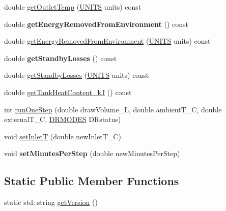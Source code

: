 \begin{DoxyCompactItemize}
\item 
double \hyperlink{class_h_p_w_h_a0b75a215e395f52d60997f9b07d37de7}{get\-Outlet\-Temp} (\hyperlink{class_h_p_w_h_a145320dbf116b9245ac4421026cff294}{U\-N\-I\-T\-S} units) const 
\item 
\hypertarget{class_h_p_w_h_a4ee36fec9eb6e1294ad200aeca2da87f}{double {\bfseries get\-Energy\-Removed\-From\-Environment} () const }\label{class_h_p_w_h_a4ee36fec9eb6e1294ad200aeca2da87f}

\item 
double \hyperlink{class_h_p_w_h_af58e48e9103fbb5525a251744816cc77}{get\-Energy\-Removed\-From\-Environment} (\hyperlink{class_h_p_w_h_a145320dbf116b9245ac4421026cff294}{U\-N\-I\-T\-S} units) const 
\item 
\hypertarget{class_h_p_w_h_ae615d088a390d0e1db95a196406ba2b4}{double {\bfseries get\-Standby\-Losses} () const }\label{class_h_p_w_h_ae615d088a390d0e1db95a196406ba2b4}

\item 
double \hyperlink{class_h_p_w_h_a5cccd4667bf976b0a6c1d33ce5fec880}{get\-Standby\-Losses} (\hyperlink{class_h_p_w_h_a145320dbf116b9245ac4421026cff294}{U\-N\-I\-T\-S} units) const 
\item 
double \hyperlink{class_h_p_w_h_a38039325e4eb5b4537ccafd0a4e3c1ad}{get\-Tank\-Heat\-Content\-\_\-k\-J} () const 
\item 
int \hyperlink{class_h_p_w_h_a68a687d987105c10a17bac1a94be5224}{run\-One\-Step} (double draw\-Volume\-\_\-\-L, double ambient\-T\-\_\-\-C, double external\-T\-\_\-\-C, \hyperlink{class_h_p_w_h_a6a74814715ed6a33a75fd0d9dc3e7107}{D\-R\-M\-O\-D\-E\-S} D\-Rstatus)
\item 
void \hyperlink{class_h_p_w_h_a5df4fd4422ba54080f519aaf6375be32}{set\-Inlet\-T} (double new\-Inlet\-T\-\_\-\-C)
\item 
\hypertarget{class_h_p_w_h_a5752aa0b3488189c7321c174887f1c31}{void {\bfseries set\-Minutes\-Per\-Step} (double new\-Minutes\-Per\-Step)}\label{class_h_p_w_h_a5752aa0b3488189c7321c174887f1c31}

\end{DoxyCompactItemize}
\subsection*{Static Public Member Functions}
\begin{DoxyCompactItemize}
\item 
static std\-::string \hyperlink{class_h_p_w_h_a001c10815863cb3efdb721d364111275}{get\-Version} ()
\end{DoxyCompactItemize}
